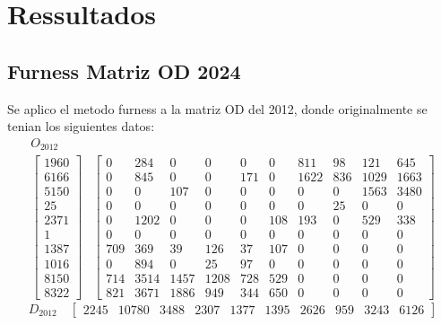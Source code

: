 \documentclass[12pt]{article} %
\begin{document}

\setcounter{page}{1}

\section{Ressultados}

\subsection{Furness Matriz OD 2024}

Se aplico el metodo furness a la matriz OD del 2012, donde originalmente se tenian los siguientes datos:
{\footnotesize
  \[
  \begin{array}{cc}
  \text{$O_{2012}$} & \\
  \left[ \begin{array}{c}
  1960 \\
  6166 \\
  5150 \\
  25 \\
  2371 \\
  1 \\
  1387 \\
  1016 \\
  8150 \\
  8322
  \end{array} \right] &
  \left[ \begin{array}{cccccccccc}
  0 & 284 & 0 & 0 & 0 & 0 & 811 & 98 & 121 & 645 \\
  0 & 845 & 0 & 0 & 171 & 0 & 1622 & 836 & 1029 & 1663 \\
  0 & 0 & 107 & 0 & 0 & 0 & 0 & 0 & 1563 & 3480 \\
  0 & 0 & 0 & 0 & 0 & 0 & 0 & 25 & 0 & 0 \\
  0 & 1202 & 0 & 0 & 0 & 108 & 193 & 0 & 529 & 338 \\
  0 & 0 & 0 & 0 & 0 & 0 & 0 & 0 & 0 & 0 \\
  709 & 369 & 39 & 126 & 37 & 107 & 0 & 0 & 0 & 0 \\
  0 & 894 & 0 & 25 & 97 & 0 & 0 & 0 & 0 & 0 \\
  714 & 3514 & 1457 & 1208 & 728 & 529 & 0 & 0 & 0 & 0 \\
  821 & 3671 & 1886 & 949 & 344 & 650 & 0 & 0 & 0 & 0
  \end{array} \right]
  \end{array}
  \]
  \[
  \text{$D_{ 2012}$} \quad \left[ \begin{array}{cccccccccc}
    2245 & 10780 & 3488 & 2307 & 1377 & 1395 & 2626 & 959 & 3243 & 6126
  \end{array} \right]
  \]
}
\end{document}
